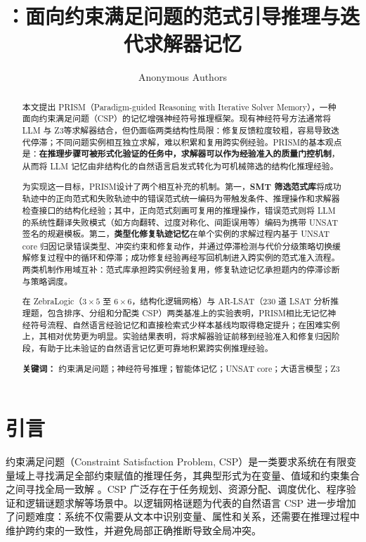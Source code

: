 \documentclass[UTF8,a4paper,12pt]{ctexart}
\title{\PRISM：面向约束满足问题的范式引导推理与迭代求解器记忆}
\author{Anonymous Authors}
\date{}
\newcommand{\PRISM}{PRISM}
\newcommand{\zthree}{Z3}
\begin{document}
\maketitle

\begin{abstract}
本文提出 \PRISM（Paradigm-guided Reasoning with Iterative Solver Memory），一种面向约束满足问题（CSP）的记忆增强神经符号推理框架。现有神经符号方法通常将 LLM 与 \zthree 等求解器结合，但仍面临两类结构性局限：修复反馈粒度较粗，容易导致迭代停滞；不同问题实例相互独立求解，难以积累和复用跨实例经验。\PRISM 的基本观点是：\textbf{在推理步骤可被形式化验证的任务中，求解器可以作为经验准入的质量门控机制}，从而将 LLM 记忆由非结构化的自然语言启发式转化为可机械筛选的结构化推理经验。

为实现这一目标，\PRISM 设计了两个相互补充的机制。第一，\textbf{SMT 筛选范式库}将成功轨迹中的正向范式和失败轨迹中的错误范式统一编码为带触发条件、推理操作和求解器检查接口的结构化经验；其中，正向范式刻画可复用的推理操作，错误范式则将 LLM 的系统性翻译失败模式（如方向翻转、过度对称化、间距误用等）编码为携带 UNSAT 签名的规避模板。第二，\textbf{类型化修复轨迹记忆}在单个实例的求解过程内基于 UNSAT core 归因记录错误类型、冲突约束和修复动作，并通过停滞检测与代价分级策略切换缓解修复过程中的循环和停滞；成功修复经验再经写回机制进入跨实例的范式准入流程。两类机制作用域互补：范式库承担跨实例经验复用，修复轨迹记忆承担题内的停滞诊断与策略调度。

在 ZebraLogic（$3\!\times\!5$ 至 $6\!\times\!6$，结构化逻辑网格）与 AR-LSAT（230 道 LSAT 分析推理题，包含排序、分组和分配类 CSP）两类基准上的实验表明，\PRISM 相比无记忆神经符号流程、自然语言经验记忆和直接检索式少样本基线均取得稳定提升；在困难实例上，其相对优势更为明显。实验结果表明，将求解器验证前移到经验准入和修复归因阶段，有助于比未验证的自然语言记忆更可靠地积累跨实例推理经验。

\noindent\textbf{关键词：}
约束满足问题；神经符号推理；智能体记忆；UNSAT core；大语言模型；Z3
\end{abstract}

\section{引言}

约束满足问题（Constraint Satisfaction Problem, CSP）是一类要求系统在有限变量域上寻找满足全部约束赋值的推理任务，其典型形式为在变量、值域和约束集合之间寻找全局一致解 \cite{dechter2003}。CSP 广泛存在于任务规划、资源分配、调度优化、程序验证和逻辑谜题求解等场景中。以逻辑网格谜题为代表的自然语言 CSP 进一步增加了问题难度：系统不仅需要从文本中识别变量、属性和关系，还需要在推理过程中维护跨约束的一致性，并避免局部正确推断导致全局冲突。
\end{document}
